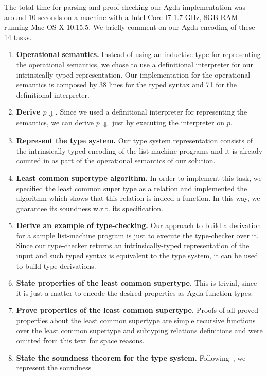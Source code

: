 \documentclass[review]{elsarticle}
\theoremstyle{definition}
\begin{document}
The total time for parsing and proof checking our Agda implementation was around 10 seconds
on a machine with a Intel Core I7 1.7 GHz, 8GB RAM running Mac OS X 10.15.5. We briefly comment
on our Agda encoding of these 14 tasks.

\begin{enumerate}
  \item \textbf{Operational semantics.} Instead of using an inductive type for representing the operational semantics, we chose to
        use a definitional interpreter for our intrinsically-typed representation. Our implementation for the operational
        semantics is composed by 38 lines for the typed syntax and 71 for the definitional interpreter.
  \item \textbf{Derive $p \Downarrow$.} Since we used a definitional interpreter for representing the semantics, we can derive
        $p\,\Downarrow$ just by executing the interpreter on $p$.
  \item \textbf{Represent the type system.} Our type system representation consists of the intrinsically-typed encoding of
        the list-machine programs and it is already counted in as part of the operational semantics of our solution.
      \item \textbf{Least common supertype algorithm.} In order to implement this task, we specified the least common super type
        as a relation and implemented the algorithm which shows that this relation is indeed a function. In this way, we
        guarantee its soundness w.r.t. its specification.
  \item \textbf{Derive an example of type-checking.} Our approach to build a derivation for a sample list-machine program
        is just to execute the type-checker over it. Since our type-checker returns an intrinsically-typed representation of
        the input and such typed syntax is equivalent to the type system, it can be used to build type derivations.
  \item \textbf{State properties of the least common supertype.} This is trivial, since it is just a matter to encode the
        desired properties as Agda function types.
  \item \textbf{Prove properties of the least common supertype.} Proofs of all proved properties about the least common supertype
        are simple recursive functions over the least common supertype and subtyping relations definitions and were omitted
        from this text for space reasons.
  \item \textbf{State the soundness theorem for the type system.} Following~\cite{Amin17}, we represent the soundness

\end{enumerate}
\end{document}
